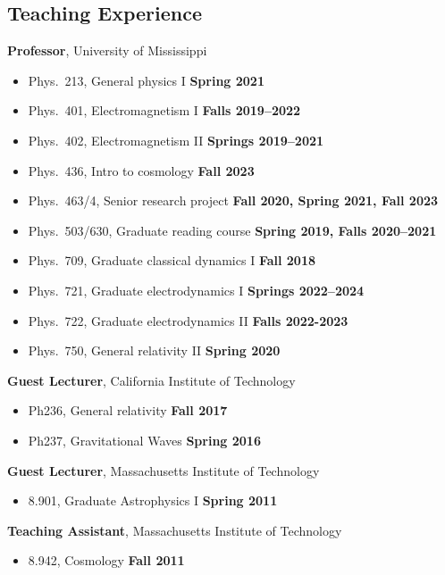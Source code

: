 \documentclass[margin,line]{res}
\begin{document}
\begin{resume}
  \section{\sc Teaching Experience}
   {\bf Professor}, University of Mississippi
  \vspace*{.05in}
  \begin{itemize}
    \item[ ] Phys.~213, General physics I \hfill {\bf Spring 2021}
    \item[ ] Phys.~401, Electromagnetism I \hfill {\bf Falls 2019--2022}
    \item[ ] Phys.~402, Electromagnetism II \hfill {\bf Springs 2019--2021}
    \item[ ] Phys.~436, Intro to cosmology \hfill {\bf Fall 2023}
    \item[ ] Phys.~463/4, Senior research project \hfill {\bf Fall 2020,
        Spring 2021, Fall 2023}
    \item[ ] Phys.~503/630, Graduate reading course \hfill {\bf Spring 2019, Falls 2020--2021}
    \item[ ] Phys.~709, Graduate classical dynamics I \hfill {\bf Fall 2018}
    \item[ ] Phys.~721, Graduate electrodynamics I \hfill {\bf Springs 2022--2024}
    \item[ ] Phys.~722, Graduate electrodynamics II \hfill {\bf Falls 2022-2023}
    \item[ ] Phys.~750, General relativity II \hfill {\bf Spring 2020}
  \end{itemize}
  {\bf Guest Lecturer}, California Institute of Technology
  \vspace*{.05in}
  \begin{itemize}
    \item[ ] Ph236, General relativity \hfill {\bf Fall 2017}
    \item[ ] Ph237, Gravitational Waves \hfill {\bf Spring 2016}
  \end{itemize}
  {\bf Guest Lecturer}, Massachusetts Institute of Technology
  \vspace*{.05in}
  \begin{itemize}
    \item[ ] 8.901, Graduate Astrophysics I \hfill {\bf Spring 2011}
  \end{itemize}
  {\bf Teaching Assistant}, Massachusetts Institute of Technology
  \vspace*{.05in}
  \begin{itemize}
    \item[ ] 8.942, Cosmology \hfill {\bf Fall 2011}

\end{itemize}
\end{resume}
\end{document}
